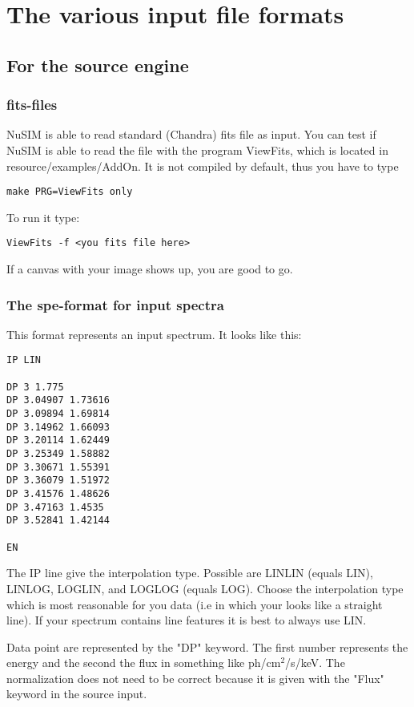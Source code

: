 \chapter{The various input file formats}

\section{For the source engine}

\subsection{fits-files}

NuSIM is able to read standard (Chandra) fits file as input.
You can test if NuSIM is able to read the file with the program ViewFits, which is located in resource/examples/AddOn. It is not compiled by default, thus you have to type
\begin{verbatim}
make PRG=ViewFits only
\end{verbatim}
To run it type:
\begin{verbatim}
ViewFits -f <you fits file here>
\end{verbatim}
If a canvas with your image shows up, you are good to go.

\subsection{The spe-format for input spectra}

This format represents an input spectrum.
It looks like this:
\begin{verbatim}
IP LIN

DP 3 1.775
DP 3.04907 1.73616
DP 3.09894 1.69814
DP 3.14962 1.66093
DP 3.20114 1.62449
DP 3.25349 1.58882
DP 3.30671 1.55391
DP 3.36079 1.51972
DP 3.41576 1.48626
DP 3.47163 1.4535
DP 3.52841 1.42144

EN
\end{verbatim}

The IP line give the interpolation type. Possible are LINLIN (equals LIN), LINLOG, LOGLIN, and LOGLOG (equals LOG). Choose the interpolation type which is most reasonable for you data (i.e in which your looks like a straight line).
If your spectrum contains line features it is best to always use LIN.

Data point are represented by the "DP" keyword.
The first number represents the energy and the second the flux in something like ph/cm$^2$/s/keV.
The normalization does not need to be correct because it is given with the "Flux" keyword in the source input.


